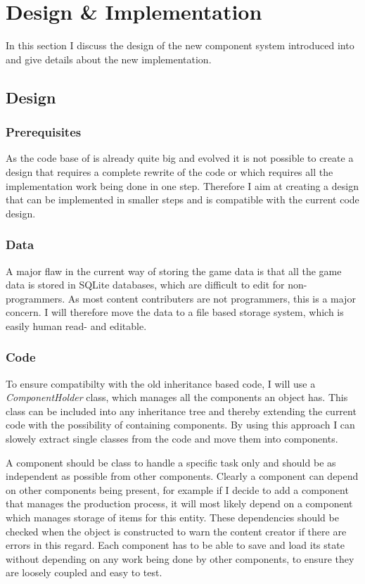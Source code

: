 \section{Design \& Implementation}
In this section I discuss the design of the new component system introduced into \UH{} and give details about the new
implementation.

\subsection{Design}

\subsubsection{Prerequisites}
As the code base of \UH{} is already quite big and evolved it is not possible to create a design that requires a
complete rewrite of the code or which requires all the implementation work being done in one step. Therefore I aim at
creating a design that can be implemented in smaller steps and is compatible with the current code design.

\subsubsection{Data}
A major flaw in the current \UH{} way of storing the game data is that all the game data is stored in SQLite databases,
which are difficult to edit for non-programmers. As most content contributers are not programmers, this is a major
concern. I will therefore move the data to a file based storage system, which is easily human read- and editable.

\subsubsection{Code}
To ensure compatibilty with the old inheritance based code, I will use a \textit{ComponentHolder} class, which manages all the
components an object has. This class can be included into any inheritance tree and thereby extending the current code
with the possibility of containing components. By using this approach I can slowely extract single classes from the code
and move them into components.

A component should be class to handle a specific task only and should be as independent
as possible from other components. Clearly a component can depend on other components being present, for example if I
decide to add a component that manages the production process, it will most likely depend on a component which manages
storage of items for this entity. These dependencies should be checked when the object is constructed to warn the
content creator if there are errors in this regard.
Each component has to be able to save and load its state without depending on any work being done by other components,
to ensure they are loosely coupled and easy to test.

